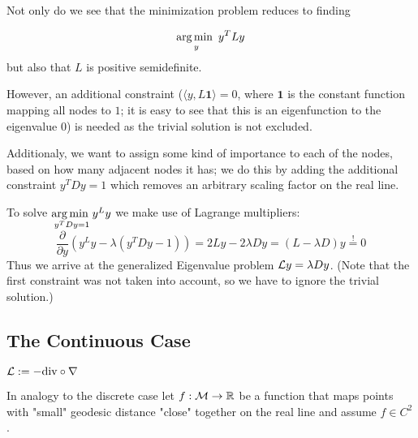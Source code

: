 Not only do we see that the minimization problem reduces to finding

\begin{equation*}
    \argmin_y y^TLy
\end{equation*}
but also that $L$ is positive semidefinite.

However, an additional constraint ($\langle y,L\mathbf{1}\rangle = 0$, where $\mathbf{1}$ is the constant function mapping all nodes to $1$; it is easy to see that this is an eigenfunction to the eigenvalue $0$) is needed as the trivial solution is not excluded.

Additionaly, we want to assign some kind of importance to each of the nodes, based on how many adjacent nodes it has; we do this by adding the additional constraint $y^TDy=1$ which removes an arbitrary scaling factor on the real line.

To solve $\underset{y^TDy=1}{\argmin}y^Ly$ we make use of Lagrange multipliers:
\begin{equation*}
    \frac{\partial}{\partial y}(y^Ly-\lambda(y^TDy-1)) =
    2Ly-2\lambda Dy =
    (L-\lambda D)y \overset{!}{=}0
\end{equation*}
Thus we arrive at the generalized Eigenvalue problem $\mathcal{L} y=\lambda Dy$. (Note that the first constraint was not taken into account, so we have to ignore the trivial solution.)

\subsection{The Continuous Case}
\begin{definition}
    $\mathcal{L} :=-\mathrm{div}\circ\nabla$
\end{definition}

In analogy to the discrete case let $f:\mathcal{M}\rightarrow\mathbb{R}$ be a function that maps points with "small" geodesic distance "close" together on the real line and assume $f\in C^2$.